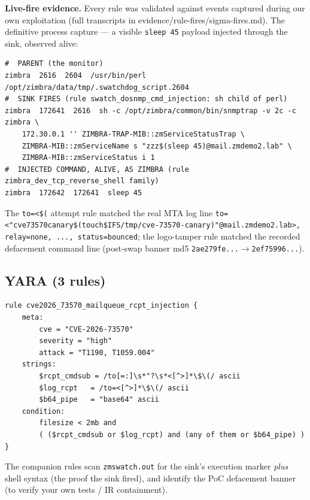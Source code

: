 \textbf{Live-fire evidence.} Every rule was validated against events captured
during our own exploitation (full transcripts in
evidence/rule-fires/sigma-fires.md). The definitive process capture — a
visible \texttt{sleep 45} payload injected through the sink, observed alive:
\begin{lstlisting}[style=shell,caption={Live process tree during injection (2026-08-24 08:42 UTC)}]
#  PARENT (the monitor)
zimbra  2616  2604  /usr/bin/perl /opt/zimbra/data/tmp/.swatchdog_script.2604
#  SINK FIRES (rule swatch_dosnmp_cmd_injection: sh child of perl)
zimbra  172641  2616  sh -c /opt/zimbra/common/bin/snmptrap -v 2c -c zimbra \
    172.30.0.1 '' ZIMBRA-TRAP-MIB::zmServiceStatusTrap \
    ZIMBRA-MIB::zmServiceName s "zzz$(sleep 45)@mail.zmdemo2.lab" \
    ZIMBRA-MIB::zmServiceStatus i 1
#  INJECTED COMMAND, ALIVE, AS ZIMBRA (rule zimbra_dev_tcp_reverse_shell family)
zimbra  172642  172641  sleep 45
\end{lstlisting}
The \texttt{to=<\$(} attempt rule matched the real MTA log line
\texttt{to=<"cve73570canary\$(touch\${IFS}/\hspace{0pt}tmp/cve-73570-canary)"@\hspace{0pt}mail.zmdemo2.lab>,
relay=none, ..., status=bounced}; the logo-tamper rule matched the recorded
defacement command line (post-swap banner md5
\texttt{2ae279fe...}$\rightarrow$\texttt{2ef75996...}).

\subsection{YARA (3 rules)}

\begin{lstlisting}[style=yar,caption={YARA: envelope recipient with command substitution (mail-queue scan)}]
rule cve2026_73570_mailqueue_rcpt_injection {
    meta:
        cve = "CVE-2026-73570"
        severity = "high"
        attack = "T1190, T1059.004"
    strings:
        $rcpt_cmdsub = /to[=:]\s*"?\s*<[^>]*\$\(/ ascii
        $log_rcpt   = /to=<[^>]*\$\(/ ascii
        $b64_pipe   = "base64" ascii
    condition:
        filesize < 2mb and
        ( ($rcpt_cmdsub or $log_rcpt) and (any of them or $b64_pipe) )
}
\end{lstlisting}

The companion rules scan \texttt{zmswatch.out} for the sink's execution
marker \emph{plus} shell syntax (the proof the sink fired), and identify the
PoC defacement banner (to verify your own tests / IR containment).

